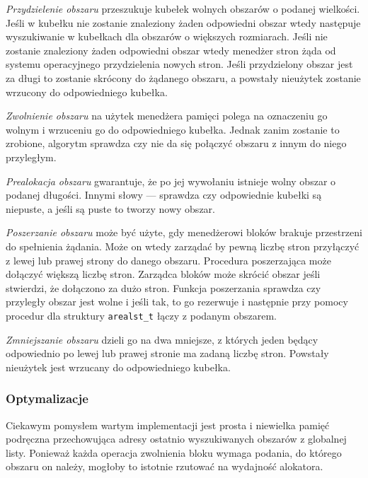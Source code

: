 \documentclass[12pt,a4paper,titlepage,twoside]{mwart}
\begin{document}
\textit{Przydzielenie obszaru} przeszukuje kubełek wolnych obszarów o podanej
wielkości. Jeśli w kubełku nie zostanie znaleziony żaden odpowiedni obszar
wtedy następuje wyszukiwanie w kubełkach dla obszarów o większych rozmiarach.
Jeśli nie zostanie znaleziony żaden odpowiedni obszar wtedy menedżer stron żąda
od systemu operacyjnego przydzielenia nowych stron.  Jeśli przydzielony obszar
jest za długi to zostanie skrócony do żądanego obszaru, a powstały nieużytek
zostanie wrzucony do odpowiedniego kubełka.

\textit{Zwolnienie obszaru} na użytek menedżera pamięci polega na oznaczeniu go
wolnym i wrzuceniu go do odpowiedniego kubełka. Jednak zanim zostanie to zrobione,
algorytm sprawdza czy nie da się połączyć obszaru z innym do niego przyległym.

\textit{Prealokacja obszaru} gwarantuje, że po jej wywołaniu istnieje wolny
obszar o podanej długości. Innymi słowy --- sprawdza czy odpowiednie kubełki są
niepuste, a jeśli są puste to tworzy nowy obszar.

\textit{Poszerzanie obszaru} może być użyte, gdy menedżerowi bloków brakuje
przestrzeni do spełnienia żądania. Może on wtedy zarządać by pewną liczbę stron
przyłączyć z lewej lub prawej strony do danego obszaru. Procedura poszerzająca
może dołączyć większą liczbę stron. Zarządca bloków może skrócić obszar jeśli
stwierdzi, że dołączono za dużo stron. Funkcja poszerzania sprawdza czy
przyległy obszar jest wolne i jeśli tak, to go rezerwuje i następnie przy pomocy
procedur dla struktury \verb+arealst_t+ łączy z podanym obszarem.

\textit{Zmniejszanie obszaru} dzieli go na dwa mniejsze, z których jeden będący
odpowiednio po lewej lub prawej stronie ma zadaną liczbę stron. Powstały
nieużytek jest wrzucany do odpowiedniego kubełka.

\subsubsection{Optymalizacje}

Ciekawym pomysłem wartym implementacji jest prosta i niewielka pamięć podręczna
przechowująca adresy ostatnio wyszukiwanych obszarów z globalnej listy.
Ponieważ każda operacja zwolnienia bloku wymaga podania, do którego obszaru on
należy, mogłoby to istotnie rzutować na wydajność alokatora.
\end{document}
